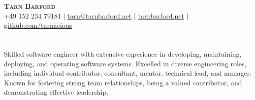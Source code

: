 \documentclass[letterpaper,11pt]{article}
\begin{document}
\begin{center}
    \textbf{\Huge \scshape Tarn Barford} \\ \vspace{1pt}
    \small +49 152 234 79181 $|$
    \href{mailto:tarn@tarnbarford.net}{\uline{tarn@tarnbarford.net}} $|$
    \href{https://tarnbarford.net}{\uline{tarnbarford.net}} $|$
    \href{https://github.com/tarnacious}{\uline{github.com/tarnacious}}
\end{center}

\section*{}
  \small { Skilled software engineer with extensive experience in developing, maintaining, deploying, and operating software systems. Excelled in diverse engineering roles, including individual contributor, consultant, mentor, technical lead, and manager. Known for fostering strong team relationships, being a valued contributor, and demonstrating effective leadership. }
\end{document}
